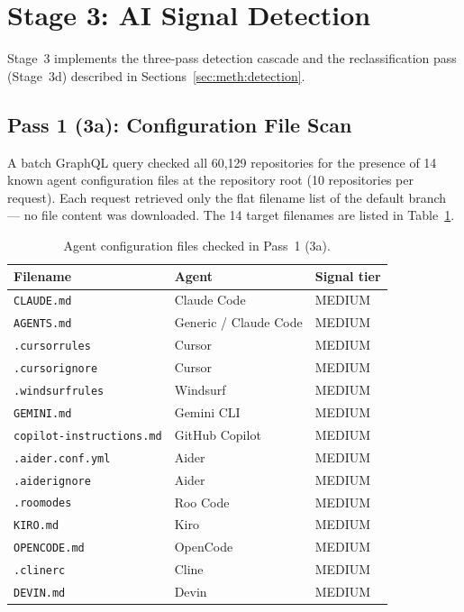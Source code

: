 \section{Stage 3: AI Signal Detection}
\label{sec:impl:detection}

Stage~3 implements the three-pass detection cascade and the reclassification pass (Stage~3d) described in Sections~\ref{sec:meth:detection}.

\subsection{Pass 1 (3a): Configuration File Scan}

A batch GraphQL query checked all 60,129 repositories for the presence of 14 known agent configuration files at the repository root (10 repositories per request). Each request retrieved only the flat filename list of the default branch --- no file content was downloaded. The 14 target filenames are listed in Table~\ref{tab:config_files}.

\begin{table}[h]
\centering
\caption{Agent configuration files checked in Pass~1 (3a).}
\label{tab:config_files}
\begin{tabular}{@{}lll@{}}
\toprule
Filename & Agent & Signal tier \\
\midrule
\texttt{CLAUDE.md}                   & Claude Code                & MEDIUM \\
\texttt{AGENTS.md}                   & Generic / Claude Code      & MEDIUM \\
\texttt{.cursorrules}                & Cursor                     & MEDIUM \\
\texttt{.cursorignore}               & Cursor                     & MEDIUM \\
\texttt{.windsurfrules}              & Windsurf                   & MEDIUM \\
\texttt{GEMINI.md}                   & Gemini CLI                 & MEDIUM \\
\texttt{copilot-instructions.md}     & GitHub Copilot             & MEDIUM \\
\texttt{.aider.conf.yml}             & Aider                      & MEDIUM \\
\texttt{.aiderignore}                & Aider                      & MEDIUM \\
\texttt{.roomodes}                   & Roo Code                   & MEDIUM \\
\texttt{KIRO.md}                     & Kiro                       & MEDIUM \\
\texttt{OPENCODE.md}                 & OpenCode                   & MEDIUM \\
\texttt{.clinerc}                    & Cline                      & MEDIUM \\
\texttt{DEVIN.md}                    & Devin                      & MEDIUM \\
\bottomrule
\end{tabular}
\end{table}

